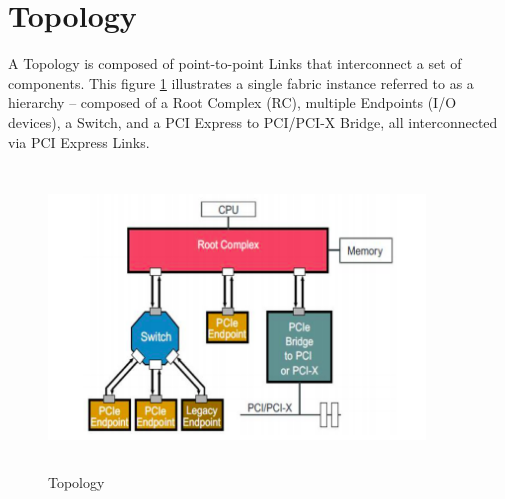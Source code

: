 \section{Topology}

A Topology is composed of point-to-point Links that interconnect a set of components.
This figure \ref{T} illustrates a single fabric instance referred to as a hierarchy – composed of a
Root Complex (RC), multiple Endpoints (I/O devices), a Switch, and a PCI Express to
PCI/PCI-X Bridge, all interconnected via PCI Express Links.

\begin{figure}[H]
  \centering
  \includegraphics[width=100mm,height=80mm]{images/T.png}
  \caption{Topology}
  \label{T}
\end{figure}

